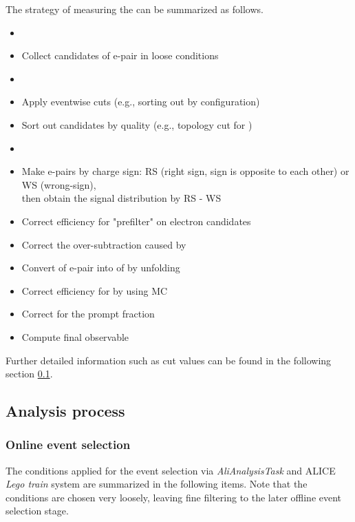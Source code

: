 The strategy of measuring the \Xic can be summarized as follows.
%
\begin{itemize}
    \small
    \item[]  \vspace{1pt}
    \item[-] Collect candidates of e-\Xim pair in loose conditions \vspace{\columnsep}
    \item[]  \vspace{1pt}
    \item[-] Apply eventwise cuts (e.g., sorting out by configuration)
    \item[-] Sort out candidates by quality (e.g., topology cut for \Xim) \vspace{\columnsep}
    \item[]  \vspace{1pt}
    \item[1.] Make e-\Xim pairs by charge sign: RS (right sign, sign is opposite to each other) or WS (wrong-sign), \\then obtain the signal distribution by RS - WS
    \item[2.] Correct efficiency for "prefilter" on electron candidates
    \item[3.] Correct the over-subtraction caused by \Xib
    \item[4.] Convert \pt of e-\Xim pair into \pt of \Xic by unfolding
    \item[5.] Correct efficiency for \Xic by using MC
    \item[6.] Correct for the prompt \Xic fraction
    \item[7.] Compute final observable
\end{itemize}
%
Further detailed information such as cut values can be found in the following section \ref{subsec:anaPrs}.





\clearpage

\subsection{Analysis process} \label{subsec:anaPrs}
\subsubsection{Online event selection} \label{subsubsec:onSel}
The conditions applied for the event selection via \textit{AliAnalysisTask} and ALICE \textit{Lego train} system are summarized in the following items. Note that the conditions are chosen very loosely, leaving fine filtering to the later offline event selection stage.

